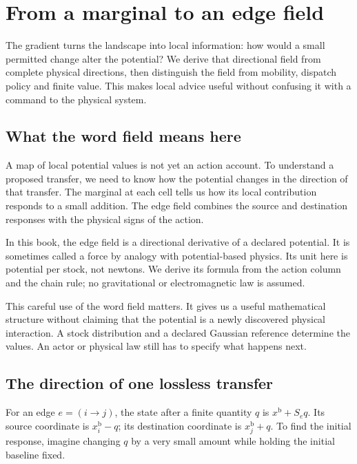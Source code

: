\chapter{From a marginal to an edge field}\label{ch:field}

The gradient turns the landscape into local information: how would a small permitted change alter the potential? We derive that directional field from complete physical directions, then distinguish the field from mobility, dispatch policy and finite value. This makes local advice useful without confusing it with a command to the physical system.


\section{What the word field means here}
A map of local potential values is not yet an action account. To understand a proposed transfer, we need to know how the potential changes in the direction of that transfer. The marginal at each cell tells us how its local contribution responds to a small addition. The edge field combines the source and destination responses with the physical signs of the action.

In this book, the edge field is a directional derivative of a declared potential. It is sometimes called a force by analogy with potential-based physics. Its unit here is potential per stock, not newtons. We derive its formula from the action column and the chain rule; no gravitational or electromagnetic law is assumed.

This careful use of the word field matters. It gives us a useful mathematical structure without claiming that the potential is a newly discovered physical interaction. A stock distribution and a declared Gaussian reference determine the values. An actor or physical law still has to specify what happens next.

\section{The direction of one lossless transfer}
For an edge \(e=(i\to j)\), the state after a finite quantity \(q\) is \(x^{\mathrm{b}}+S_e q\). Its source coordinate is \(x^{\mathrm{b}}_i-q\); its destination coordinate is \(x^{\mathrm{b}}_j+q\). To find the initial response, imagine changing \(q\) by a very small amount while holding the initial baseline fixed.

